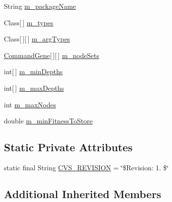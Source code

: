 \begin{DoxyCompactItemize}
\item 
String \hyperlink{classorg_1_1jgap_1_1distr_1_1grid_1_1gp_1_1_grid_configuration_g_p_base_ae66c37906c01e4c5d2a60d3d62a0574e}{m\-\_\-package\-Name}
\item 
Class\mbox{[}$\,$\mbox{]} \hyperlink{classorg_1_1jgap_1_1distr_1_1grid_1_1gp_1_1_grid_configuration_g_p_base_a6d17b6ae0876a6fc28b3c5be8246b689}{m\-\_\-types}
\item 
Class\mbox{[}$\,$\mbox{]}\mbox{[}$\,$\mbox{]} \hyperlink{classorg_1_1jgap_1_1distr_1_1grid_1_1gp_1_1_grid_configuration_g_p_base_a3a929cfdf3dcf84b23bff20e2c56a1e5}{m\-\_\-arg\-Types}
\item 
\hyperlink{classorg_1_1jgap_1_1gp_1_1_command_gene}{Command\-Gene}\mbox{[}$\,$\mbox{]}\mbox{[}$\,$\mbox{]} \hyperlink{classorg_1_1jgap_1_1distr_1_1grid_1_1gp_1_1_grid_configuration_g_p_base_a838942c287a96ee78bdb39aa2fd7966a}{m\-\_\-node\-Sets}
\item 
int\mbox{[}$\,$\mbox{]} \hyperlink{classorg_1_1jgap_1_1distr_1_1grid_1_1gp_1_1_grid_configuration_g_p_base_ace1dc28643f001bfdedacf3fa0f241d9}{m\-\_\-min\-Depths}
\item 
int\mbox{[}$\,$\mbox{]} \hyperlink{classorg_1_1jgap_1_1distr_1_1grid_1_1gp_1_1_grid_configuration_g_p_base_ab71e5873e0a0a4c83e0d102a92bc333f}{m\-\_\-max\-Depths}
\item 
int \hyperlink{classorg_1_1jgap_1_1distr_1_1grid_1_1gp_1_1_grid_configuration_g_p_base_a593ec73125a1f428e3473ee2e42db9c4}{m\-\_\-max\-Nodes}
\item 
double \hyperlink{classorg_1_1jgap_1_1distr_1_1grid_1_1gp_1_1_grid_configuration_g_p_base_a4124a94a68dfcbdd84b9f2d8748235b5}{m\-\_\-min\-Fitness\-To\-Store}
\end{DoxyCompactItemize}
\subsection*{Static Private Attributes}
\begin{DoxyCompactItemize}
\item 
static final String \hyperlink{classorg_1_1jgap_1_1distr_1_1grid_1_1gp_1_1_grid_configuration_g_p_base_a6d248a4d50b4ac47f5de1d93bd360d87}{C\-V\-S\-\_\-\-R\-E\-V\-I\-S\-I\-O\-N} = \char`\"{}\$Revision\-: 1. \$\char`\"{}
\end{DoxyCompactItemize}
\subsection*{Additional Inherited Members}


